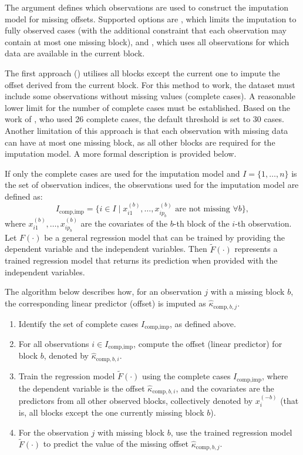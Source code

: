 The argument  defines which observations are used to construct the imputation model for missing offsets. Supported options are , which limits the imputation to fully observed cases (with the additional constraint that each observation may contain at most one missing block), and , which uses all observations for which data are available in the current block.

The first approach () utilises all blocks except the current one to impute the offset derived from the current block. For this method to work, the dataset must include some observations without missing values (complete cases). A reasonable lower limit for the number of complete cases must be established. Based on the work of \citet{hieke2016integrating}, who used 26 complete cases, the default threshold is set to 30 cases. Another limitation of this approach is that each observation with missing data can have at most one missing block, as all other blocks are required for the imputation model. A more formal description is provided below.

If only the complete cases are used for the imputation model and \( I = \{1, \ldots, n\} \)
is the set of observation indices, the observations used for the imputation model are defined as:
\[
I_{\text{comp,imp}} = \{i \in I \mid x^{(b)}_{i1}, \ldots, x^{(b)}_{ip_b} \text{ are not missing } \forall b\},
\]
where \( x^{(b)}_{i1}, \ldots, x^{(b)}_{ip_b} \) are the covariates of the \( b \)-th block of the \( i \)-th observation. 
Let \( F(\cdot) \) be a general regression model that can be trained by providing the dependent variable and the independent variables. Then \( \tilde{F}(\cdot) \) represents a trained regression model that returns its prediction when provided with the independent variables.

The algorithm below describes how, for an observation \( j \) with a missing block \( b \), 
the corresponding linear predictor (offset) is imputed as \( \hat{\kappa}_{\text{comp},b,j} \).

\begin{enumerate}
    \item Identify the set of complete cases \( I_{\text{comp,imp}} \), as defined above.
    \item For all observations \( i \in I_{\text{comp,imp}} \), compute the offset (linear predictor) 
    for block \( b \), denoted by \( \hat{\kappa}_{\text{comp},b,i} \).
    \item Train the regression model \( \tilde{F}(\cdot) \) using the complete cases \( I_{\text{comp,imp}} \), 
    where the dependent variable is the offset \( \hat{\kappa}_{\text{comp},b,i} \), 
    and the covariates are the predictors from all other observed blocks, collectively denoted by \( x^{(-b)}_i \)
    (that is, all blocks except the one currently missing block \( b \)).
    \item For the observation \( j \) with missing block \( b \), 
    use the trained regression model \( \tilde{F}(\cdot) \) to predict the value of the missing 
    offset \( \hat{\kappa}_{\text{comp},b,j} \).
\end{enumerate}

